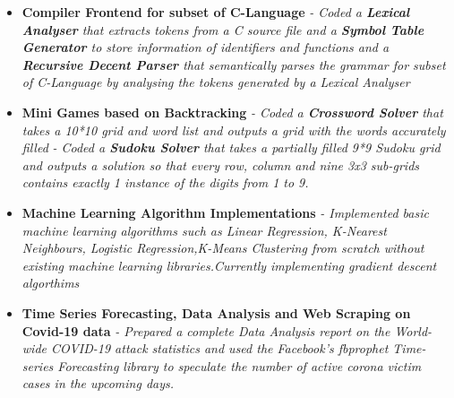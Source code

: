 \documentclass{article}
\begin{document}
\begin{itemize}
    \item{\textbf{\large{Compiler Frontend for subset of C-Language}}}
          \newline
          \textit{- Coded a \textbf{Lexical Analyser} that extracts tokens from a C source file and a \textbf{Symbol Table Generator} to store information of identifiers and functions and a \textbf{Recursive Decent Parser} that semantically parses the grammar for subset of C-Language by analysing the tokens generated by a Lexical Analyser}

    \item{\textbf{\large{Mini Games based on Backtracking}}}
          \newline
          \textit{- Coded a \textbf{Crossword Solver} that takes a 10*10 grid and word list and outputs a grid with the words accurately filled}
          \newline
          \textit{- Coded a \textbf{Sudoku Solver} that takes a partially filled 9*9 Sudoku grid and outputs a solution so that every row, column and nine 3x3 sub-grids contains exactly 1 instance of the digits from 1 to 9.}

    \item{\textbf{\large{Machine Learning Algorithm Implementations}}}
          \newline
          \textit{- Implemented basic machine learning algorithms such as Linear Regression, K-Nearest Neighbours, Logistic Regression,K-Means Clustering from scratch without existing machine learning libraries.Currently implementing gradient descent algorthims}


    \item{\textbf{\large{Time Series Forecasting, Data Analysis and Web Scraping on Covid-19 data}}}
          \newline
          \textit{- Prepared a complete Data Analysis report on the World-wide COVID-19 attack statistics and used the Facebook's fbprophet Time-series Forecasting library to speculate the number of active corona victim cases in the upcoming days.}


\end{itemize}
\end{document}
